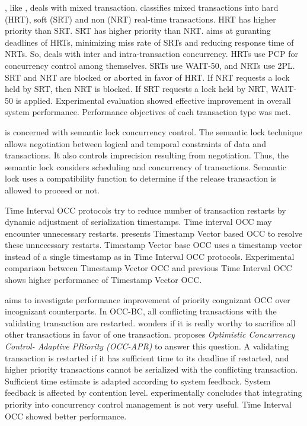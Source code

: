\cite{853991}, like \cite{lam1997concurrency}, deals with mixed
transaction. \cite{853991} classifies mixed transactions into hard
(HRT), soft (SRT) and non (NRT) real-time transactions. HRT has higher
priority than SRT. SRT has higher priority than NRT. \cite{853991}
aims at guranting deadlines of HRTs, minimizing miss rate of SRTs
and reducing response time of NRTs. So, \cite{853991} deals with
inter and intra-transaction concurrency. HRTs use PCP for concurrency
control among themselves. SRTs use WAIT-50, and NRTs use 2PL. SRT
and NRT are blocked or aborted in favor of HRT. If NRT requests a
lock held by SRT, then NRT is blocked. If SRT requests a lock held
by NRT, WAIT-50 is applied. Experimental evaluation showed effective
improvement in overall system performance. Performance objectives
of each transaction type was met.

\cite{1401009} is concerned with semantic lock concurrency control.
The semantic lock technique allows negotiation between logical and
temporal constraints of data and transactions. It also controls imprecision
resulting from negotiation. Thus, the semantic lock considers scheduling
and concurrency of transactions. Semantic lock uses a compatibility
function to determine if the release transaction is allowed to proceed
or not.

Time Interval OCC protocols try to reduce number of transaction restarts
by dynamic adjustment of serialization timestamps. Time interval OCC
may encounter unnecessary restarts. \cite{4680843} presents Timestamp
Vector based OCC to resolve these unnecessary restarts. Timestamp
Vector base OCC uses a timestamp vector instead of a single timestamp
as in Time Interval OCC protocols. Experimental comparison between
Timestamp Vector OCC and previous Time Interval OCC shows higher performance
of Timestamp Vector OCC.

\cite{859541} aims to investigate performance improvement of priority
congnizant OCC over incognizant counterparts. In OCC-BC, all conflicting
transactions with the validating transaction are restarted. \cite{859541}
wonders if it is really worthy to sacrifice all other transactions
in favor of one transaction. \cite{859541} proposes \textit{Optimistic
Concurrency Control- Adaptive PRiority (OCC-APR)} to answer this question.
A validating transaction is restarted if it has sufficient time to
its deadline if restarted, and higher priority transactions cannot
be serialized with the conflicting transaction. Sufficient time estimate
is adapted according to system feedback. System feedback is affected
by contention level. \cite{859541} experimentally concludes that
integrating priority into concurrency control management is not very
useful. Time Interval OCC showed better performance.

